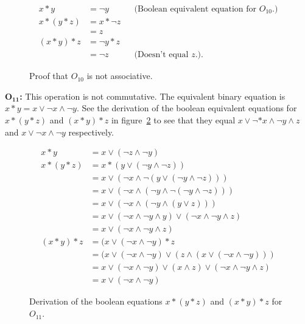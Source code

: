 \documentclass{amsart}
\begin{document}
\begin{enumerate}
   \begin{figure}
      \caption{Proof that $O_{10}$ is not associative.}
      \label{fig:o10_assoc}
      \begin{align*}
         x * y & = \neg y  && \text{(Boolean equivalent equation for $O_{10}$.)} \\
         x * (y * z) & = x * \neg z \\
	             & = z \\
         (x * y) * z & = \neg y * z \\
	             & = \neg z && \text{(Doesn't equal $z$.)}.
      \end{align*}
   \end{figure}


   $\mathbf{O_{11}}$\textbf{:} This operation is not commutative. 
   The equivalent binary equation is $x * y = x \vee \neg x \wedge \neg y$. See
   the derivation of the boolean equivalent equations for $x * (y * z)$ and $(x
   * y) * z$ in figure~\ref{fig:o11_assoc} to see that they equal $x \vee \neg
   * x \wedge \neg y \wedge z$ and $x \vee \neg x \wedge \neg y$ respectively.

   \begin{figure}
      \caption{Derivation of the boolean equations $x * (y * z)$ and
      $(x * y) * z$ for $O_{11}$.}
      \label{fig:o11_assoc}
      \begin{align*}
         x * y & = x \vee (\neg z \wedge \neg y) \\
	 x * (y * z) & = x * (y \vee (\neg y \wedge \neg z)) \\
	             & = x \vee (\neg x \wedge \neg (y \vee (\neg y 
		         \wedge \neg z))) \\
	             & = x \vee (\neg x \wedge (\neg y \wedge \neg (\neg y
		         \wedge \neg z)))  \\
	             & = x \vee (\neg x \wedge (\neg y \wedge (y \vee z))) \\
		     & = x \vee (\neg x \wedge \neg y \wedge y) 
		         \vee (\neg x \wedge \neg y \wedge z) \\
		     & = x \vee (\neg x \wedge \neg y \wedge z) \\
         (x * y) * z & = (x \vee (\neg x \wedge \neg y) * z \\
	             & = (x \vee (\neg x \wedge \neg y) \vee 
		         (z \wedge (x \vee (\neg x \wedge \neg y))) \\
		     & = x \vee (\neg x \wedge \neg y) \vee (x \wedge z)
		         \vee (\neg x \wedge \neg y \wedge z) \\
		     & = x \vee (\neg x \wedge \neg y)
      \end{align*}
   \end{figure}



\end{enumerate}
\end{document}
